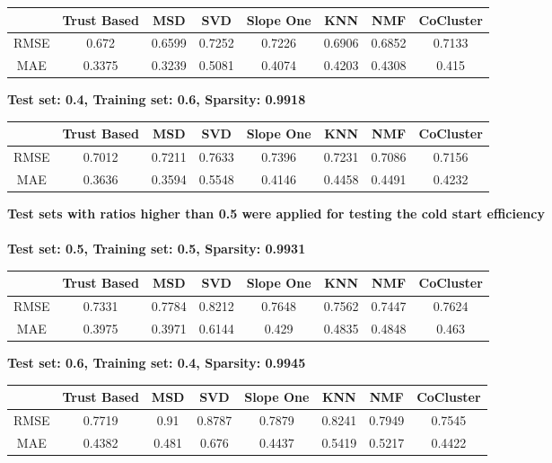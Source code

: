 \begin{center}
	\begin{tabular}{ | c | c | c | c | c | c | c | c |}
		\hline
		& Trust Based & MSD & SVD & Slope One & KNN & NMF & CoCluster\\ 
		\hline
		RMSE&0.672  & 0.6599  & 0.7252  & 0.7226  & 0.6906  & 0.6852  & 0.7133\\
		\hline
		MAE&0.3375  & 0.3239  & 0.5081  & 0.4074  & 0.4203  & 0.4308  & 0.415\\
		\hline
	\end{tabular}
\end{center} 
\vspace{1cm}
\textbf{Test set: 0.4, Training set: 0.6, Sparsity: 0.9918}
\begin{center}
	\begin{tabular}{ | c | c | c | c | c | c | c | c |}
		\hline
		& Trust Based & MSD & SVD & Slope One & KNN & NMF & CoCluster\\ 
		\hline
		RMSE&0.7012  & 0.7211  & 0.7633  & 0.7396  & 0.7231  & 0.7086  & 0.7156\\
		\hline
		MAE&0.3636  & 0.3594  & 0.5548  & 0.4146  & 0.4458  & 0.4491  & 0.4232\\
		\hline
	\end{tabular}
\end{center} 
\vspace{1cm}
\textbf{Test sets with ratios higher than 0.5 were applied for testing the cold start efficiency}\\ \\
\textbf{Test set: 0.5, Training set: 0.5, Sparsity: 0.9931}
\begin{center}
	\begin{tabular}{ | c | c | c | c | c | c | c | c |}
		\hline
		& Trust Based & MSD & SVD & Slope One & KNN & NMF & CoCluster\\ 
		\hline
		RMSE&0.7331  & 0.7784  & 0.8212  & 0.7648  & 0.7562  & 0.7447  & 0.7624\\
		\hline
		MAE&0.3975  & 0.3971  & 0.6144  & 0.429  & 0.4835  & 0.4848  & 0.463\\
		\hline
	\end{tabular}
\end{center} 
\vspace{1cm}
\textbf{Test set: 0.6, Training set: 0.4, Sparsity: 0.9945}
\begin{center}
	\begin{tabular}{ | c | c | c | c | c | c | c | c |}
		\hline
		& Trust Based & MSD & SVD & Slope One & KNN & NMF & CoCluster\\ 
		\hline
		RMSE&0.7719  & 0.91  & 0.8787  & 0.7879  & 0.8241  & 0.7949  & 0.7545\\
		\hline
		MAE&0.4382  & 0.481  & 0.676  & 0.4437  & 0.5419  & 0.5217  & 0.4422\\
		\hline
	\end{tabular}
\end{center} 
